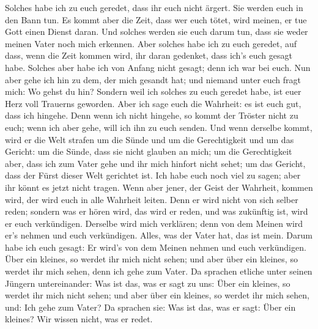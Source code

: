 Solches habe ich zu euch geredet, dass ihr euch nicht
ärgert.  Sie werden euch in den Bann tun. Es kommt aber
die Zeit, dass wer euch tötet, wird meinen, er tue Gott einen Dienst
daran.  Und solches werden sie euch darum tun, dass sie
weder meinen Vater noch mich erkennen.  Aber solches habe
ich zu euch geredet, auf dass, wenn die Zeit kommen wird, ihr daran
gedenket, dass ich's euch gesagt habe. Solches aber habe ich von Anfang
nicht gesagt; denn ich war bei euch.  Nun aber gehe ich
hin zu dem, der mich gesandt hat; und niemand unter euch fragt mich: Wo
gehst du hin?  Sondern weil ich solches zu euch geredet
habe, ist euer Herz voll Trauerns geworden.  Aber ich sage
euch die Wahrheit: es ist euch gut, dass ich hingehe. Denn wenn ich
nicht hingehe, so kommt der Tröster nicht zu euch; wenn ich aber gehe,
will ich ihn zu euch senden.  Und wenn derselbe kommt,
wird er die Welt strafen um die Sünde und um die Gerechtigkeit und um
das Gericht:  um die Sünde, dass sie nicht glauben an
mich;  um die Gerechtigkeit aber, dass ich zum Vater gehe
und ihr mich hinfort nicht sehet;  um das Gericht, dass
der Fürst dieser Welt gerichtet ist.  Ich habe euch noch
viel zu sagen; aber ihr könnt es jetzt nicht tragen. 
Wenn aber jener, der Geist der Wahrheit, kommen wird, der wird euch in
alle Wahrheit leiten. Denn er wird nicht von sich selber reden; sondern
was er hören wird, das wird er reden, und was zukünftig ist, wird er
euch verkündigen.  Derselbe wird mich verklären; denn von
dem Meinen wird er's nehmen und euch verkündigen.  Alles,
was der Vater hat, das ist mein. Darum habe ich euch gesagt: Er wird's
von dem Meinen nehmen und euch verkündigen.  Über ein
kleines, so werdet ihr mich nicht sehen; und aber über ein kleines, so
werdet ihr mich sehen, denn ich gehe zum Vater.  Da
sprachen etliche unter seinen Jüngern untereinander: Was ist das, was er
sagt zu uns: Über ein kleines, so werdet ihr mich nicht sehen; und aber
über ein kleines, so werdet ihr mich sehen, und: Ich gehe zum Vater?
 Da sprachen sie: Was ist das, was er sagt: Über ein
kleines? Wir wissen nicht, was er redet.

